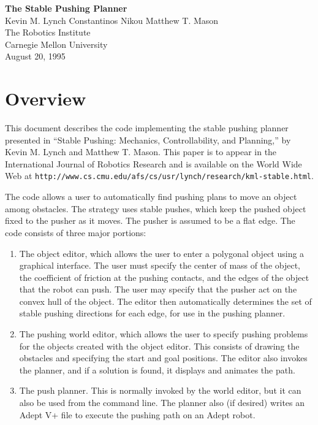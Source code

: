 
\textheight 8.5in
\textwidth 6.8in
\topmargin -0.25in
\oddsidemargin -0.25in
\evensidemargin -0.25in


\begin{centering}
{\bf{\LARGE The Stable Pushing Planner}} \\
\vspace*{0.2in}
Kevin M. Lynch \hspace{0.2in} Constantinos Nikou \hspace{0.2in} Matthew T. Mason\\
The Robotics Institute \\
Carnegie Mellon University \\
August 20, 1995 \\
\end{centering}

\section{Overview}

This document describes the code implementing the stable pushing planner
presented in ``Stable Pushing:  Mechanics, Controllability, and Planning,''
by Kevin M. Lynch and Matthew T. Mason.  This paper is to appear in the
International Journal of Robotics Research and is available on the
World Wide Web at 
{\verb+http://www.cs.cmu.edu/afs/cs/usr/lynch/research/kml-stable.html+}.

The code allows a user to automatically find pushing plans to move an
object among obstacles.  The strategy uses stable pushes, which keep
the pushed object fixed to the pusher as it moves.  The pusher is
assumed to be a flat edge.  The code consists of three major portions:

\begin{enumerate}
\item The object editor, which allows the user to enter a polygonal object
using a graphical interface.  The user must specify the center of mass of
the object, the coefficient of friction at the pushing contacts,
and the edges of the object that the robot can push.
The user may specify that the pusher act on the convex hull of the object.
The editor then automatically determines the set of
stable pushing directions for each edge, for use in the pushing planner.

\item The pushing world editor, which allows the user to specify pushing
problems for the objects created with the object editor.  This consists
of drawing the obstacles and specifying the start and goal positions.
The editor also invokes the planner, and if a solution is found, it 
displays and animates the path.

\item The push planner.  This is normally invoked by the world editor,
but it can also be used from the command line.  The planner also (if
desired) writes an Adept V+ file to execute the pushing path on an
Adept robot.
\end{enumerate}

